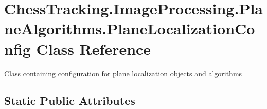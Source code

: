 \hypertarget{class_chess_tracking_1_1_image_processing_1_1_plane_algorithms_1_1_plane_localization_config}{}\section{Chess\+Tracking.\+Image\+Processing.\+Plane\+Algorithms.\+Plane\+Localization\+Config Class Reference}
\label{class_chess_tracking_1_1_image_processing_1_1_plane_algorithms_1_1_plane_localization_config}


Class containing configuration for plane localization objects and algorithms  


\subsection*{Static Public Attributes}
